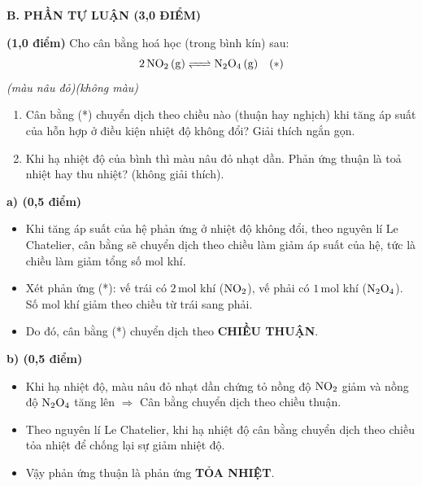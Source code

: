 \documentclass[11pt,a4paper]{article}
\begin{document}
\vspace{6pt}
\noindent
\textbf{\large\color{hfRed}B. PHẦN TỰ LUẬN (3,0 ĐIỂM)}
\vspace{4pt}


\begin{ex}%
\textbf{(1,0 điểm)} Cho cân bằng hoá học (trong bình kín) sau:
$$\ce{2NO2 (g) <=> N2O4 (g)}\quad (*)$$
\quad\quad\quad\quad\textit{(màu nâu đỏ)}\quad\quad\quad\textit{(không màu)}
\begin{enumerate}[label=\textbf{\alph*)}]
\item Cân bằng (*) chuyển dịch theo chiều nào (thuận hay nghịch) khi tăng áp suất của hỗn hợp ở điều kiện nhiệt độ không đổi? Giải thích ngắn gọn.
\item Khi hạ nhiệt độ của bình thì màu nâu đỏ nhạt dần. Phản ứng thuận là toả nhiệt hay thu nhiệt? (không giải thích).
\end{enumerate}
\begin{loigiai}
\textbf{a) (0,5 điểm)}
\begin{itemize}[leftmargin=0.8cm]
\item Khi tăng áp suất của hệ phản ứng ở nhiệt độ không đổi, theo nguyên lí Le Chatelier, cân bằng sẽ chuyển dịch theo chiều làm giảm áp suất của hệ, tức là chiều làm giảm tổng số mol khí.
\item Xét phản ứng (*): vế trái có $2\,\text{mol}$ khí ($\ce{NO2}$), vế phải có $1\,\text{mol}$ khí ($\ce{N2O4}$). Số mol khí giảm theo chiều từ trái sang phải.
\item Do đó, cân bằng (*) chuyển dịch theo \textbf{CHIỀU THUẬN}.
\end{itemize}
\textbf{b) (0,5 điểm)}
\begin{itemize}[leftmargin=0.8cm]
\item Khi hạ nhiệt độ, màu nâu đỏ nhạt dần chứng tỏ nồng độ $\ce{NO2}$ giảm và nồng độ $\ce{N2O4}$ tăng lên $\Rightarrow$ Cân bằng chuyển dịch theo chiều thuận.
\item Theo nguyên lí Le Chatelier, khi hạ nhiệt độ cân bằng chuyển dịch theo chiều tỏa nhiệt để chống lại sự giảm nhiệt độ.
\item Vậy phản ứng thuận là phản ứng \textbf{TỎA NHIỆT}.
\end{itemize}
\end{loigiai}
\end{ex}
\end{document}

